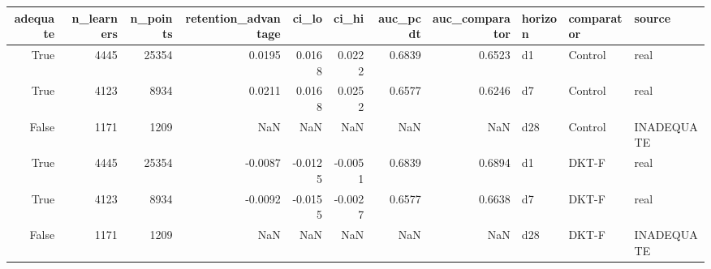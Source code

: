 \begin{tabular}{rrrrrrrrlll}
\toprule
adequate & n\_learners & n\_points & retention\_advantage & ci\_lo & ci\_hi & auc\_pcdt & auc\_comparator & horizon & comparator & source \\
\midrule
True & 4445 & 25354 & 0.0195 & 0.0168 & 0.0222 & 0.6839 & 0.6523 & d1 & Control & real \\
True & 4123 & 8934 & 0.0211 & 0.0168 & 0.0252 & 0.6577 & 0.6246 & d7 & Control & real \\
False & 1171 & 1209 & NaN & NaN & NaN & NaN & NaN & d28 & Control & INADEQUATE \\
True & 4445 & 25354 & -0.0087 & -0.0125 & -0.0051 & 0.6839 & 0.6894 & d1 & DKT-F & real \\
True & 4123 & 8934 & -0.0092 & -0.0155 & -0.0027 & 0.6577 & 0.6638 & d7 & DKT-F & real \\
False & 1171 & 1209 & NaN & NaN & NaN & NaN & NaN & d28 & DKT-F & INADEQUATE \\
\bottomrule
\end{tabular}
